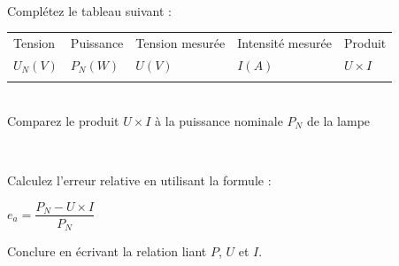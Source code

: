 \documentclass[11pt,a4paper]{article}
\newcommand{\cadreblanc}[1]{%
\medskip\framebox[\linewidth][c]{%
\rule{0mm}{#1mm}}\par
\medskip}
\begin{document}
\\
 Complétez le tableau suivant : 

\begin{center}
    

    \begin{tabular}{|C{2cm}|C{2cm}||C{2cm}|C{2cm}||C{2cm}|}
         \hline
         Tension & Puissance &  Tension mesurée & Intensité mesurée & Produit\\
         
         $U_N (V)$ & $P_N (W)$ & $U (V)$  & $I (A)$ & $U \times I$ \\
         \hline
           &  &  &  & \\
         \hline
 
    \end{tabular}
\end{center}




 \\[5mm]
 Comparez le produit $U \times I$ à la puissance nominale $P_N$ de la lampe\\
\vspace{3mm}
\dotfill 





\\[5mm]
\begin{multicols}{2}

  Calculez l'erreur relative en utilisant la formule : 
\begin{multicols}{2} 
\begin{center}
    
$e_a= \dfrac{P_N - U \times I}{P_N}$ \end{center}
   \cadreblanc{10}
\end{multicols}
 Conclure en écrivant la relation liant $P$, $U$ et $I$. 
\vfill 
   \cadreblanc{10}

\end{multicols}
\end{document}

